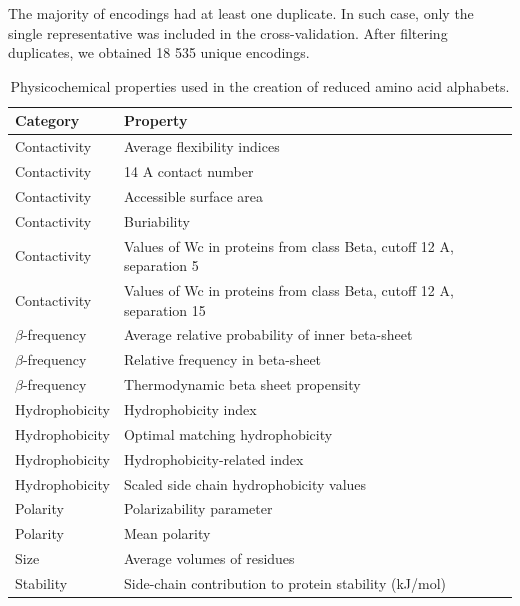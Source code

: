 \documentclass{bioinfo}
\begin{document}
\begin{methods}
  The majority of encodings had at least one duplicate. In such case, only the 
single representative was included in the cross-validation. After filtering 
duplicates, we obtained 18 535 unique encodings.

\begin{table}[bth]
\centering
\begin{tabular}{ll}
  \hline
Category & Property \\ 
  \hline
  Contactivity & Average flexibility indices \citep{bhaskaran_positional_1988} \\ 
  Contactivity & 14 A contact number \citep{nishikawa_radial_1986} \\ 
  Contactivity & Accessible surface area \citep{radzicka_comparing_1988} \\ 
    Contactivity & Buriability \citep{zhou_quantifying_2004} \\ 
  Contactivity & Values of Wc in proteins from class Beta, cutoff 12 A, separation 5 \citep{wozniak_characteristics_2014} \\ 
  Contactivity & Values of Wc in proteins from class Beta, cutoff 12 A, separation 15 \citep{wozniak_characteristics_2014} \\ 
  $\beta$-frequency & Average relative probability of inner beta-sheet \citep{kanehisa_local_1980} \\ 
  $\beta$-frequency & Relative frequency in beta-sheet \citep{prabhakaran_distribution_1990} \\ 
  $\beta$-frequency & Thermodynamic beta sheet propensity \citep{kim_thermodynamic_1993} \\ 
  Hydrophobicity & Hydrophobicity index \citep{argos_structural_1982} \\ 
  Hydrophobicity & Optimal matching hydrophobicity \citep{sweet_correlation_1983} \\ 
  Hydrophobicity & Hydrophobicity-related index \citep{kidera_statistical_1985} \\ 
  Hydrophobicity & Scaled side chain hydrophobicity values \citep{black_development_1991} \\ 
  Polarity & Polarizability parameter \citep{charton_structural_1982} \\ 
  Polarity & Mean polarity \citep{radzicka_comparing_1988} \\ 
  Size & Average volumes of residues \citep{pontius_deviations_1996} \\ 
  Stability & Side-chain contribution to protein stability (kJ/mol) \citep{takano_new_2001} \\ 
   \hline
\end{tabular}
\caption{Physicochemical properties used in the creation of reduced amino acid alphabets.} 
\end{table}


\end{methods}
\end{document}
